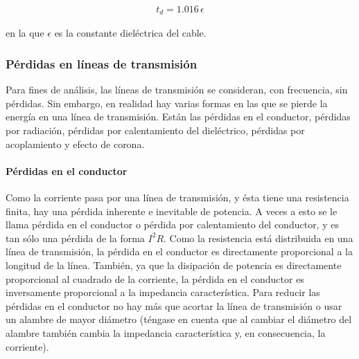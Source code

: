                 \begin{gather}
                    t_d=1.016 \, \epsilon \label{eq:ti_retardo_2}
                \end{gather}

                en la que $\epsilon$ es la constante dieléctrica del cable.

        \subsubsection{Pérdidas en líneas de transmisión}

            Para fines de análisis, las líneas de transmisión se consideran, con frecuencia, sin pérdidas. Sin embargo, en realidad hay varias formas en las que se pierde la energía en una línea de transmisión. Están las pérdidas en el conductor, pérdidas por radiación, pérdidas por calentamiento del dieléctrico, pérdidas por acoplamiento y efecto de corona.

            \paragraph{Pérdidas en el conductor}

                Como la corriente pasa por una línea de transmisión, y ésta tiene una resistencia finita, hay una pérdida inherente e inevitable de potencia. A veces a esto se le llama pérdida en el conductor o pérdida por calentamiento del conductor, y es tan sólo una pérdida de la forma $I^2R$. Como la resistencia está distribuida en una línea de transmisión, la pérdida en el conductor es directamente proporcional a la longitud de la línea. También, ya que la disipación de potencia es directamente proporcional al cuadrado de la corriente, la pérdida en el conductor es inversamente proporcional a la impedancia característica. Para reducir las pérdidas en el conductor no hay más que acortar la línea de transmisión o usar un alambre de mayor diámetro (téngase en cuenta que al cambiar el diámetro del alambre también cambia la impedancia característica y, en consecuencia, la corriente).


